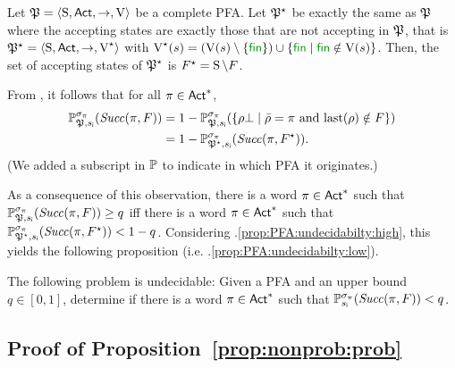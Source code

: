 Let $\pfa=\tup{\S,\Act,\ra,\V}$ be a complete PFA.  Let $\pfa^\star$
be exactly the same as $\pfa$ where the accepting states are exactly
those that are not accepting in $\pfa$, that is
$\pfa^\star=\tup{\S,\Act,\ra,\V^\star}$ with
$\V^\star(s)=(\V(s)\setminus\{\fin\})\cup\{\fin\mid{\fin\notin\V(s)}\}$.
%
Then, the set of accepting states of $\pfa^\star$ is
$F^\star=\S\setminus F$.

From , it follows that for all $\plan\in\Act^*$,
%
\begin{align*}
  \Prob_{\pfa,\sini}^{\strat_\plan}(\Succ(\plan,F)) 
  &  =
  1 - \Prob_{\pfa,\sini}^{\strat_\plan}(\{{\rho\complete}\mid{\bar{\rho}=\plan \text{ and } \last(\rho)\notin F}\}) \\
  & =
  1 - \Prob_{\pfa^\star,\sini}^{\strat_\plan}(\Succ(\plan,F^\star)).
\end{align*}
%
(We added a subscript in $\Prob$ to indicate in which PFA it
originates.)

As a consequence of this observation,
there is a word $\plan\in\Act^*$ such that
$\Prob_{\pfa,\sini}^{\strat_\plan}(\Succ(\plan,F)) \geq q$
%
iff there is a word $\plan\in\Act^*$ such that
$\Prob_{\pfa^\star,\sini}^{\strat_\plan}(\Succ(\plan,F^\star)) < 1-q$.
%
Considering
.\ref{prop:PFA:undecidabilty:high}, this
yields the following proposition
(i.e. .\ref{prop:PFA:undecidabilty:low}).

\begin{proposition}
  The following problem is undecidable:
  Given a PFA and an upper bound $q\in[0,1]$, determine if there is a
  word $\plan\in\Act^*$ such that
  $\Prob_{\sini}^{\strat_\plan}(\Succ(\plan,F)) < q$.
\end{proposition}



\subsection{Proof of Proposition~\ref{prop:nonprob:prob}}\label{proof:prop:nonprob:prob}

